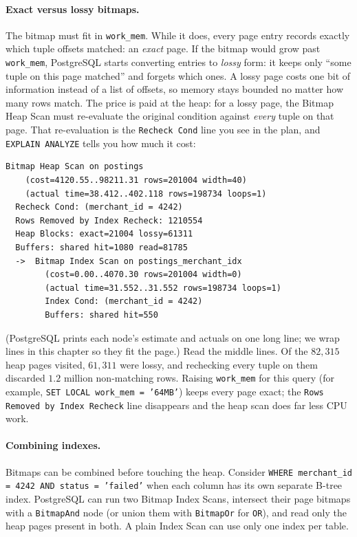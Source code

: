 \paragraph{Exact versus lossy bitmaps.} The bitmap must fit in \texttt{work\_mem}. While it does, every page entry records exactly which tuple offsets matched: an \emph{exact} page. If the bitmap would grow past \texttt{work\_mem}, PostgreSQL starts converting entries to \emph{lossy} form: it keeps only ``some tuple on this page matched'' and forgets which ones. A lossy page costs one bit of information instead of a list of offsets, so memory stays bounded no matter how many rows match. The price is paid at the heap: for a lossy page, the Bitmap Heap Scan must re-evaluate the original condition against \emph{every} tuple on that page. That re-evaluation is the \texttt{Recheck Cond} line you see in the plan, and \texttt{EXPLAIN ANALYZE} tells you how much it cost:

\begin{lstlisting}[language=Plain]
Bitmap Heap Scan on postings
    (cost=4120.55..98211.31 rows=201004 width=40)
    (actual time=38.412..402.118 rows=198734 loops=1)
  Recheck Cond: (merchant_id = 4242)
  Rows Removed by Index Recheck: 1210554
  Heap Blocks: exact=21004 lossy=61311
  Buffers: shared hit=1080 read=81785
  ->  Bitmap Index Scan on postings_merchant_idx
        (cost=0.00..4070.30 rows=201004 width=0)
        (actual time=31.552..31.552 rows=198734 loops=1)
        Index Cond: (merchant_id = 4242)
        Buffers: shared hit=550
\end{lstlisting}

(PostgreSQL prints each node's estimate and actuals on one long line; we wrap lines in this chapter so they fit the page.) Read the middle lines. Of the $82{,}315$ heap pages visited, $61{,}311$ were lossy, and rechecking every tuple on them discarded $1.2$ million non-matching rows. Raising \texttt{work\_mem} for this query (for example, \texttt{SET LOCAL work\_mem = '64MB'}) keeps every page exact; the \texttt{Rows Removed by Index Recheck} line disappears and the heap scan does far less CPU work.

\paragraph{Combining indexes.} Bitmaps can be combined before touching the heap. Consider \texttt{WHERE merchant\_id = 4242 AND status = 'failed'} when each column has its own separate B-tree index. PostgreSQL can run two Bitmap Index Scans, intersect their page bitmaps with a \texttt{BitmapAnd} node (or union them with \texttt{BitmapOr} for \texttt{OR}), and read only the heap pages present in both. A plain Index Scan can use only one index per table.

